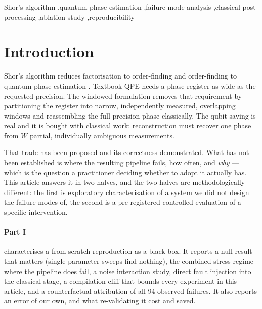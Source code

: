 \documentclass[preprint,11pt]{elsarticle}
\begin{document}
\begin{frontmatter}
\begin{keyword}
Shor's algorithm \sep quantum phase estimation \sep failure-mode analysis
\sep classical post-processing \sep ablation study \sep reproducibility
\end{keyword}

\end{frontmatter}

\section{Introduction}
\label{sec:intro}

Shor's algorithm \cite{shor1997} reduces factorisation to order-finding and
order-finding to quantum phase estimation
\cite{kitaev1995,cleve1998,nielsenchuang}. Textbook QPE needs a phase
register as wide as the requested precision. The windowed formulation
\cite{wqpe2025,modularshor2025} removes that requirement by partitioning the
register into narrow, independently measured, overlapping windows and
reassembling the full-precision phase classically. The qubit saving is real
and it is bought with classical work: reconstruction must recover one phase
from $W$ partial, individually ambiguous measurements.

That trade has been proposed and its correctness demonstrated. What has not
been established is where the resulting pipeline fails, how often, and
\emph{why} --- which is the question a practitioner deciding whether to
adopt it actually has. This article answers it in two halves, and the two
halves are methodologically different: the first is exploratory
characterisation of a system we did not design the failure modes of, the
second is a pre-registered controlled evaluation of a specific intervention.

\paragraph{Part I} characterises a from-scratch reproduction as a black box.
It reports a null result that matters (single-parameter sweeps find nothing),
the combined-stress regime where the pipeline does fail, a noise interaction
study, direct fault injection into the classical stage, a compilation cliff
that bounds every experiment in this article, and a counterfactual
attribution of all 94 observed failures. It also reports an error of our
own, and what re-validating it cost and saved.
\end{document}
